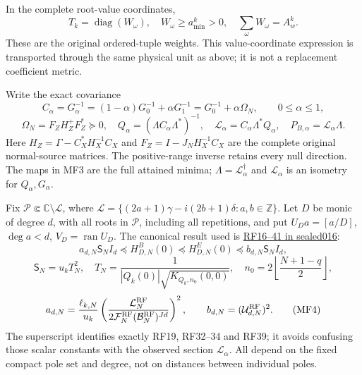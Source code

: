 \documentclass[11pt]{article}
\begin{document}
In the complete root-value coordinates, \[
T_k=\operatorname{diag}(W_\omega),\quad
W_\omega\ge a_{\min}^k>0,\quad \sum_\omega W_\omega=A_w^k.
\] These are the original ordered-tuple weights. This value-coordinate expression is transported through the same physical unit as above; it is not a replacement coefficient metric.

Write the exact covariance \[
C_\alpha=G_\alpha^{-1}=(1-\alpha)G_0^{-1}+\alpha G_1^{-1}
=G_0^{-1}+\alpha\Omega_N,\qquad0\le\alpha\le1,
\] \[
\Omega_N=F_ZH_Z^+F_Z^*\succeq0,\quad
Q_\alpha=(\Lambda C_\alpha\Lambda^*)^{-1},\quad
\mathcal L_\alpha=C_\alpha\Lambda^*Q_\alpha,\quad
P_{B,\alpha}=\mathcal L_\alpha\Lambda .
\tag{MF3}
\] Here \(H_Z=\Gamma-C_X^*H_X^{-1}C_X\) and \(F_Z=I-J_NH_X^{-1}C_X\) are the complete original normal-source matrices. The positive-range inverse retains every null direction. The maps in MF3 are the full attained minima; \(\Lambda=\mathcal L_\alpha^\dagger\) and \(\mathcal L_\alpha\) is an isometry for \(Q_\alpha,G_\alpha\).

Fix \(\mathscr P\Subset\mathbb C\setminus\mathscr L\), where \(\mathscr L=\{(2a+1)\gamma-i(2b+1)\delta:a,b\in\mathbb Z\}\). Let \(D\) be monic of degree \(d\), with all roots in \(\mathscr P\), including all repetitions, and put \(U_Da=[a/D]\), \(\deg a<d\), \(V_D=\operatorname{ran}U_D\). The canonical result used is \href{https://github.com/KokunoYumeto/zeta-function-research-reader/blob/d44d94aa43d0a1934455ddac008368583f43a2c1/workbenches/splitzero-tandem/continuations/20260921-canonical-memory-filters/RATIONAL_FILTER_PROOFS.md}{RF16--41 in sealed016}: \[
a_{d,N}\mathsf S_N I_d
\preceq H^B_{D,N}(0)\preceq H^E_{D,N}(0)
\preceq b_{d,N}\mathsf S_N I_d,
\] \[
\mathsf S_N=u_kT_N^2,\quad
T_N=\frac1{|Q_k(0)|\sqrt{K_{Q_k,n_0}(0,0)}},\quad
n_0=2\left\lfloor\frac{N+1-q}{2}\right\rfloor,
\] \[
a_{d,N}=\frac{\ell_{k,N}}{u_k}
\left(\frac{\mathcal L_N^{\rm RF}}
 {2\mathcal F_N^{\rm RF}(\mathcal B_N^{\rm RF})^{Jd}}\right)^2,\qquad
b_{d,N}=(\mathcal U_{d,N}^{\rm RF})^2 .
\tag{MF4}
\] The superscript identifies exactly RF19, RF32--34 and RF39; it avoids confusing those scalar constants with the observed section \(\mathcal L_\alpha\). All depend on the fixed compact pole set and degree, not on distances between individual poles.
\end{document}
